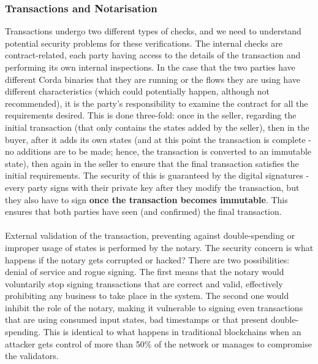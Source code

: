 \documentclass[12pt,twoside]{article}
\begin{document}
\subsubsection{Transactions and Notarisation}
Transactions undergo two different types of checks, and we need to understand potential security problems for these verifications. The internal checks are contract-related, each party having access to the details of the transaction and performing its own internal inspections. In the case that the two parties have different Corda binaries that they are running or the flows they are using have different characteristics (which could potentially happen, although not recommended), it is the party's responsibility to examine the contract for all the requirements desired. This is done three-fold: once in the seller, regarding the initial transaction (that only contains the states added by the seller), then in the buyer, after it adds its own states (and at this point the transaction is complete - no additions are to be made; hence, the transaction is converted to an immutable state), then again in the seller to ensure that the final transaction satisfies the initial requirements. The security of this is guaranteed by the digital signatures - every party signs with their private key after they modify the transaction, but they also have to sign \textbf{once the transaction becomes immutable}. This ensures that both parties have seen (and confirmed) the final transaction.
\\ \\
External validation of the transaction, preventing against double-spending or improper usage of states is performed by the notary. The security concern is what happens if the notary gets corrupted or hacked? There are two possibilities: denial of service and rogue signing. The first means that the notary would voluntarily stop signing transactions that are correct and valid, effectively prohibiting any business to take place in the system. The second one would inhibit the role of the notary, making it vulnerable to signing even transactions that are using consumed input states, bad timestamps or that present double-spending. This is identical to what happens in traditional blockchains when an attacker gets control of more than 50\% of the network or manages to compromise the validators. 
\\ \\
\end{document}
